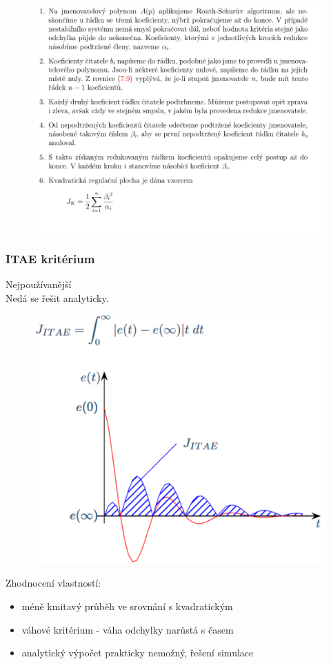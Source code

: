 \begin{figure}[H]
    \includegraphics*[scale = 1]{images/nekolnehoDoplnek.png}
\end{figure}

\subsubsection*{ITAE kritérium}
Nejpoužívanější\\
Nedá se řešit analyticky.\\
\begin{figure}[H]
    \includegraphics*[scale = 0.3]{images/ITAE.png}
\end{figure}
Zhodnocení vlastností:
\begin{itemize}
    \item méně kmitavý průběh ve srovnání s kvadratickým
    \item váhové kritérium - váha odchylky narůstá s časem
    \item analytický výpočet prakticky nemožný, řešení simulace
\end{itemize}
\newpage


